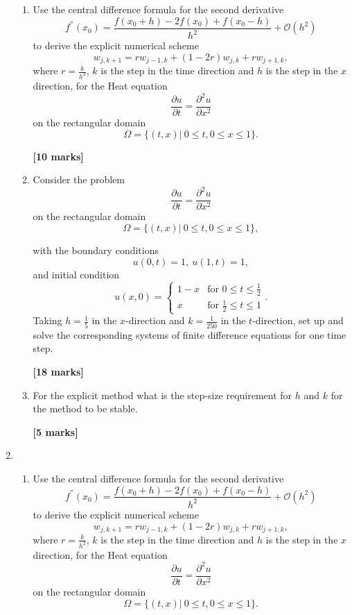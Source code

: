 \begin{enumerate}
\begin{enumerate}
	\item 
	Use the central difference formula for the second derivative 
	\[ f^{''}(x_0)=\frac{f(x_0+h)-2f(x_0)+f(x_0-h)}{h^2}+\mathcal{O}(h^2)\]
	to derive the explicit numerical scheme
	\[w_{j,k+1}=rw_{j-1,k}+(1-2r)w_{j,k}+rw_{j+1,k},\]
	where $r=\frac{k}{h^2}$, $k$ is the step in the time direction and $h$ is the step in the $x$ direction, 
	for the Heat equation 
	\[\frac{\partial u}{\partial t}=\frac{\partial^2 u}{\partial x^2} \]
	on the rectangular domain
	\[\Omega=\{(t,x)| \ 0\leq t, 0 \leq x \leq 1\}. \]

\begin{flushright}
\textbf{[10 marks]}
\end{flushright}
	
	\item Consider the problem
	\[\frac{\partial u}{\partial t}=\frac{\partial^2 u}{\partial x^2} \]
	on the rectangular domain
		\[\Omega=\{(t,x)| \ 0\leq t, 0 \leq x \leq 1\}, \]

	with the boundary conditions
	\[ u(0,t)=1, \ u(1,t)=1,   \]
	and initial condition
	\[	u(x,0)=\begin{cases}
	1-x & \text{for }0\leq t \leq \frac{1}{2}\\
	x & \text{for } \frac{1}{2}\leq t \leq 1
	\end{cases}. \]
		Taking $h=\frac{1}{5}$ in the $x$-direction and $k=\frac{1}{250}$ in the $t$-direction, set up and solve the corresponding systems of finite difference equations for one time step.\\
\begin{flushright}
\textbf{[18 marks]}
\end{flushright}
	\item
	For the explicit method what is the step-size requirement for $h$ and $k$ for the method to be stable.
\begin{flushright}
\textbf{[5 marks]}
\end{flushright}
	
	
\end{enumerate}

	\item 
\begin{enumerate}
	
	\item 
	Use the central difference formula for the second derivative 
	\[ f^{''}(x_0)=\frac{f(x_0+h)-2f(x_0)+f(x_0-h)}{h^2}+\mathcal{O}(h^2)\]
	to derive the explicit numerical scheme
	\[w_{j,k+1}=rw_{j-1,k}+(1-2r)w_{j,k}+rw_{j+1,k},\]
	where $r=\frac{k}{h^2}$, $k$ is the step in the time direction and $h$ is the step in the $x$ direction, 
	for the Heat equation 
	\[\frac{\partial u}{\partial t}=\frac{\partial^2 u}{\partial x^2} \]
	on the rectangular domain
	\[\Omega=\{(t,x)| \ 0\leq t, 0 \leq x \leq 1\}. \]


\end{enumerate}
\end{enumerate}
